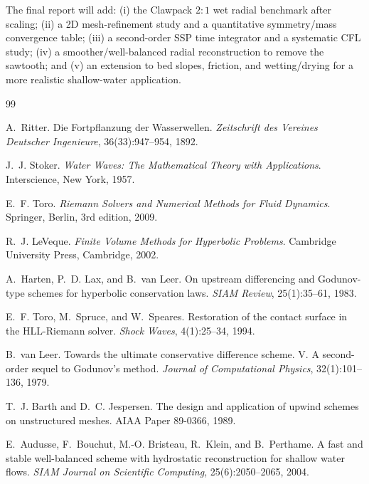 ﻿\documentclass[11pt,a4paper]{article}
\begin{document}
The final report will add: (i) the Clawpack $2:1$ wet radial benchmark after
scaling; (ii) a 2D mesh-refinement study and a quantitative symmetry/mass
convergence table; (iii) a second-order SSP time integrator and a systematic
CFL study; (iv) a smoother/well-balanced radial reconstruction to remove the
sawtooth; and (v) an extension to bed slopes, friction, and wetting/drying for
a more realistic shallow-water application.

\begin{thebibliography}{99}

A.~Ritter.
\newblock Die Fortpflanzung der Wasserwellen.
\newblock \emph{Zeitschrift des Vereines Deutscher Ingenieure},
  36(33):947--954, 1892.

J.~J. Stoker.
\newblock \emph{Water Waves: The Mathematical Theory with Applications}.
\newblock Interscience, New York, 1957.

E.~F. Toro.
\newblock \emph{Riemann Solvers and Numerical Methods for Fluid Dynamics}.
\newblock Springer, Berlin, 3rd edition, 2009.

R.~J. LeVeque.
\newblock \emph{Finite Volume Methods for Hyperbolic Problems}.
\newblock Cambridge University Press, Cambridge, 2002.

A.~Harten, P.~D. Lax, and B.~van Leer.
\newblock On upstream differencing and Godunov-type schemes for hyperbolic
  conservation laws.
\newblock \emph{SIAM Review}, 25(1):35--61, 1983.

E.~F. Toro, M.~Spruce, and W.~Speares.
\newblock Restoration of the contact surface in the HLL-Riemann solver.
\newblock \emph{Shock Waves}, 4(1):25--34, 1994.

B.~van Leer.
\newblock Towards the ultimate conservative difference scheme. V. A second-order
  sequel to Godunov's method.
\newblock \emph{Journal of Computational Physics}, 32(1):101--136, 1979.

T.~J. Barth and D.~C. Jespersen.
\newblock The design and application of upwind schemes on unstructured meshes.
\newblock AIAA Paper 89-0366, 1989.

E.~Audusse, F.~Bouchut, M.-O. Bristeau, R.~Klein, and B.~Perthame.
\newblock A fast and stable well-balanced scheme with hydrostatic reconstruction
  for shallow water flows.
\newblock \emph{SIAM Journal on Scientific Computing}, 25(6):2050--2065, 2004.


\end{thebibliography}
\end{document}
